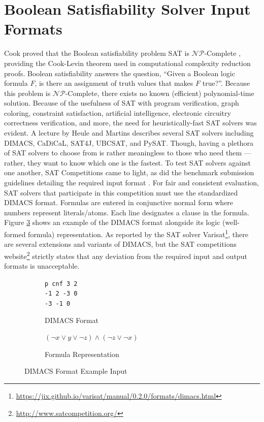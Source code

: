 \documentclass[ms]{uncgdissertationexp2}
\theoremstyle{plain}
\theoremstyle{definition}
\theoremstyle{remark}
\begin{document}
\section{Boolean Satisfiability Solver Input Formats} 
Cook proved that the Boolean satisfiability problem SAT is $\mathcal{NP}$-Complete \cite{cook}, providing the Cook-Levin theorem used in computational complexity reduction proofs. Boolean satisfiability answers the question, ``Given a Boolean logic formula $F$, is there an assignment of truth values that makes $F$ true?''. Because this problem is $\mathcal{NP}$-Complete, there exists no known (efficient) polynomial-time solution. Because of the usefulness of SAT with program verification, graph coloring, constraint satisfaction, artificial intelligence, electronic circuitry correctness verification, and more, the need for heuristically-fast SAT solvers was evident. A lecture by Heule and Martins \cite{satsolvers} describes several SAT solvers including DIMACS, CaDiCaL, SAT4J, UBCSAT, and PySAT. Though, having a plethora of SAT solvers to choose from is rather meaningless to those who need them --- rather, they want to know which one is the fastest. To test SAT solvers against one another, SAT Competitions came to light, as did the benchmark submission guidelines detailing the required input format \cite{satbenchmark}. For fair and consistent evaluation, SAT solvers that participate in this competition must use the standardized DIMACS format. Formulas are entered in conjunctive normal form where numbers represent literals/atoms. Each line designates a clause in the formula. Figure \ref{fig:dimacsexample} shows an example of the DIMACS format alongside its logic (well-formed formula) representation. As reported by the SAT solver Varisat\footnote{\url{https://jix.github.io/varisat/manual/0.2.0/formats/dimacs.html}}, there are several extensions and variants of DIMACS, but the SAT competitions website\footnote{\url{http://www.satcompetition.org/}} strictly states that any deviation from the required input and output formats is unacceptable. 
\begin{figure}[!ht]
	\centering
	\begin{subfigure}{.5\textwidth}
		\centering
		\texttt{p cnf 3 2}\\
		\texttt{-1 2 -3 0}\\
		\texttt{-3 -1 0}
		\caption{DIMACS Format}
		\label{fig:dimacs}
	\end{subfigure}%
	\begin{subfigure}{.5\textwidth}
		\centering
		$(\lnot{x} \lor y \lor \lnot{z}) \land (\lnot{z} \lor \lnot{x})$
		\caption{Formula Representation}
		\label{fig:satformat}
	\end{subfigure}
	\caption{DIMACS Format Example Input}
	\label{fig:dimacsexample}
\end{figure}
\end{document}
